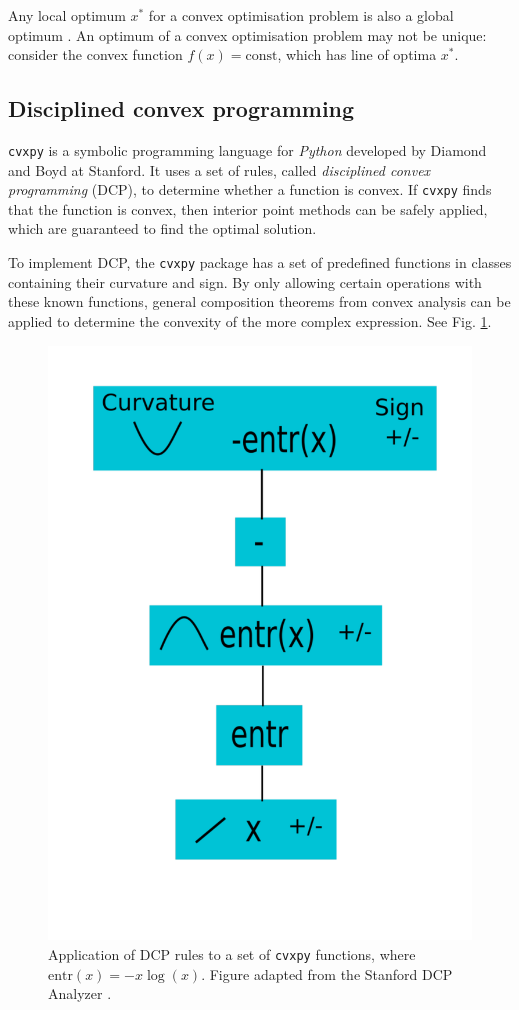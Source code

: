 \documentclass[twocolumn,secnumarabic,amssymb, nobibnotes, aps, prl,superscriptaddress]{revtex4-1}
\begin{document}
Any local optimum $x^*$ for a convex optimisation problem is also a global optimum \cite[pp.138-139]{cvxpybook}. An optimum of a convex optimisation problem may not be unique: consider the convex function $f(x) = \text{const}$, which has line of optima $x^*$.

\subsection{Disciplined convex programming}
\texttt{cvxpy} is a symbolic programming language for \textit{Python} developed by Diamond and Boyd at Stanford\cite{cvxpy}. It uses a set of rules, called \textit{disciplined convex programming} (DCP), to determine whether a function is convex. If \texttt{cvxpy} finds that the function is convex, then interior point methods can be safely applied, which are guaranteed to find the optimal solution.

To implement DCP, the \texttt{cvxpy} package has a set of predefined functions in classes containing their curvature and sign. By only allowing certain operations with these known functions, general composition theorems from convex analysis can be applied to determine the convexity of the more complex expression. See Fig. \ref{fig:DCP}.

\begin{figure}
\includegraphics[width=0.7\linewidth]{DCP.pdf}
\caption{\label{fig:DCP}Application of DCP rules to a set of \texttt{cvxpy} functions, where $\text{entr}(x)=-x\log(x)$.  Figure adapted from the Stanford DCP Analyzer \cite{dcp}.}
\end{figure}
\end{document}
